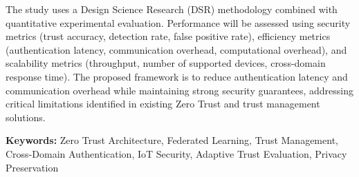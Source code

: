 The study uses a Design Science Research (DSR) methodology combined with quantitative experimental evaluation. Performance will be assessed using security metrics (trust accuracy, detection rate, false positive rate), efficiency metrics (authentication latency, communication overhead, computational overhead), and scalability metrics (throughput, number of supported devices, cross-domain response time). The proposed framework is to reduce authentication latency and communication overhead while maintaining strong security guarantees, addressing critical limitations identified in existing Zero Trust and trust management solutions.


\noindent\textbf{Keywords:} Zero Trust Architecture, Federated Learning, Trust Management, Cross-Domain Authentication, IoT Security, Adaptive Trust Evaluation, Privacy Preservation\par
